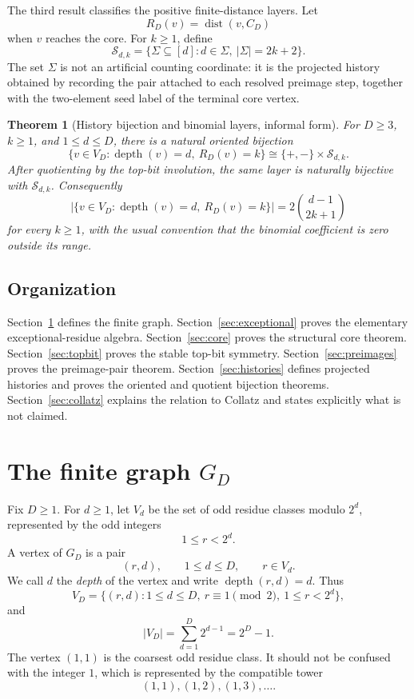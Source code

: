 \documentclass[11pt]{article}
\newtheorem{theorem}{Theorem}[section]
\theoremstyle{definition}
\theoremstyle{remark}
\newcommand{\dist}{\operatorname{dist}}
\newcommand{\depth}{\operatorname{depth}}
\newcommand{\Sfam}{\mathcal S}
\begin{document}
The third result classifies the positive finite-distance layers.  Let
\[
R_D(v)=\dist(v,C_D)
\]
when $v$ reaches the core.  For $k\ge1$, define
\[
\Sfam_{d,k}=
\{\Sigma\subseteq[d]:d\in\Sigma,
\ |\Sigma|=2k+2\}.
\]
The set $\Sigma$ is not an artificial counting coordinate: it is the projected history obtained by recording the pair attached to each resolved preimage step, together with the two-element seed label of the terminal core vertex.

\begin{theorem}[History bijection and binomial layers, informal form]
For $D\ge3$, $k\ge1$, and $1\le d\le D$, there is a natural oriented bijection
\[
\{v\in V_D:\depth(v)=d,\ R_D(v)=k\}
\cong
\{+,-\}\times\Sfam_{d,k}.
\]
After quotienting by the top-bit involution, the same layer is naturally bijective with $\Sfam_{d,k}$.  Consequently
\[
\bigl|\{v\in V_D:\depth(v)=d,\ R_D(v)=k\}\bigr|
=2\binom{d-1}{2k+1}
\]
for every $k\ge1$, with the usual convention that the binomial coefficient is zero outside its range.
\end{theorem}

\subsection{Organization}

Section~\ref{sec:graph} defines the finite graph.  Section~\ref{sec:exceptional} proves the elementary exceptional-residue algebra.  Section~\ref{sec:core} proves the structural core theorem.  Section~\ref{sec:topbit} proves the stable top-bit symmetry.  Section~\ref{sec:preimages} proves the preimage-pair theorem.  Section~\ref{sec:histories} defines projected histories and proves the oriented and quotient bijection theorems.  Section~\ref{sec:collatz} explains the relation to Collatz and states explicitly what is not claimed.

\section{The finite graph \texorpdfstring{$G_D$}{G-D}}\label{sec:graph}

Fix $D\ge1$.  For $d\ge1$, let $V_d$ be the set of odd residue classes modulo $2^d$, represented by the odd integers
\[
1\le r<2^d.
\]
A vertex of $G_D$ is a pair
\[
(r,d),
\qquad 1\le d\le D,
\qquad r\in V_d.
\]
We call $d$ the \emph{depth} of the vertex and write $\depth(r,d)=d$.  Thus
\[
V_D=\{(r,d):1\le d\le D,
\ r\equiv1\pmod2,
\ 1\le r<2^d\},
\]
and
\[
|V_D|=\sum_{d=1}^D2^{d-1}=2^D-1.
\]
The vertex $(1,1)$ is the coarsest odd residue class.  It should not be confused with the integer $1$, which is represented by the compatible tower
\[
(1,1),(1,2),(1,3),\ldots.
\]
\end{document}
